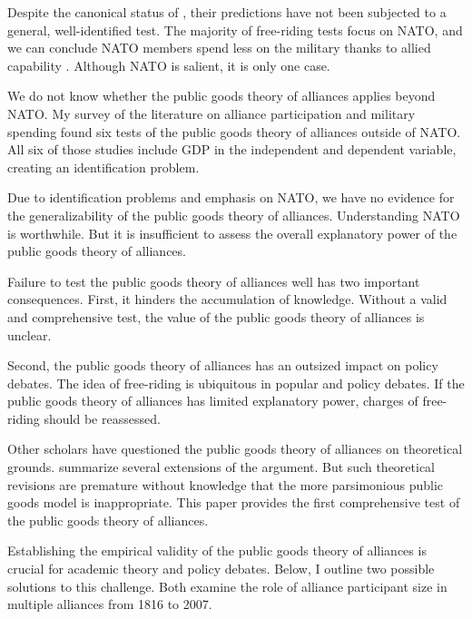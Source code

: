 \documentclass[12pt]{article}
\begin{document}
Despite the canonical status of \citet{OlsonZeckhauser1966}, their predictions have not been subjected to a general, well-identified test. 
The majority of free-riding tests focus on NATO, and we can conclude NATO members spend less on the military thanks to allied capability \citep{PluemperNeumayer2015, GeorgeSandler2017}.
Although NATO is salient, it is only one case. 


We do not know whether the public goods theory of alliances applies beyond NATO. 
My survey of the literature on alliance participation and military spending found six tests of the public goods theory of alliances outside of NATO. 
All six of those studies include GDP in the independent and dependent variable, creating an identification problem. 


Due to identification problems and emphasis on NATO, we have no evidence for the generalizability of the public goods theory of alliances. 
Understanding NATO is worthwhile. 
But it is insufficient to assess the overall explanatory power of the public goods theory of alliances. 


Failure to test the public goods theory of alliances well has two important consequences. 
First, it hinders the accumulation of knowledge. 
Without a valid and comprehensive test, the value of the public goods theory of alliances is unclear. 


Second, the public goods theory of alliances has an outsized impact on policy debates. 
The idea of free-riding is ubiquitous in popular and policy debates. 
If the public goods theory of alliances has limited explanatory power, charges of free-riding should be reassessed.


Other scholars have questioned the public goods theory of alliances on theoretical grounds.  
\citet{SandlerHartley2001} summarize several extensions of the argument.  
But such theoretical revisions are premature without knowledge that the more parsimonious public goods model is inappropriate. 
This paper provides the first comprehensive test of the public goods theory of alliances.  


Establishing the empirical validity of the public goods theory of alliances is crucial for academic theory and policy debates. 
Below, I outline two possible solutions to this challenge. 
Both examine the role of alliance participant size in multiple alliances from 1816 to 2007. 
\end{document}
